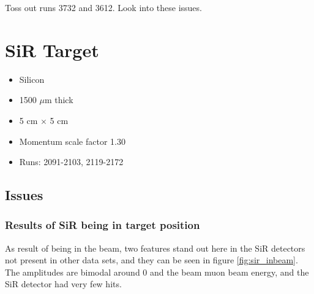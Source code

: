 \documentclass[a4paper]{article}
\begin{document}
Toss out runs 3732 and 3612. Look into these issues.



\section{SiR Target}
\begin{itemize}
  \item Silicon
  \item 1500 $\mu$m thick
  \item 5 cm $\times$ 5 cm
  \item Momentum scale factor 1.30
  \item Runs:
    2091-2103, 2119-2172
\end{itemize}

\subsection{Issues}
\subsubsection{Results of SiR being in target position}
As  result of being in the beam, two features stand out here in the SiR detectors not present
in other data sets, and they can be seen in figure \ref{fig:sir_inbeam}. The amplitudes
are bimodal around 0 and the beam muon beam energy, and the SiR detector had very few hits.
\end{document}
